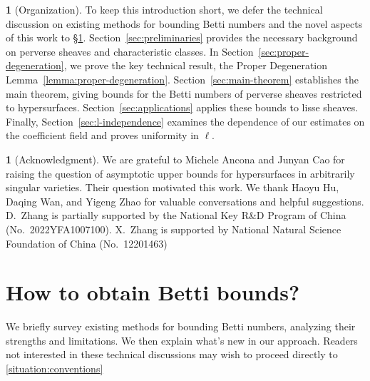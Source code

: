\documentclass[english]{smfart}
\theoremstyle{remark}
\theoremstyle{plain}
\theoremstyle{definition}
\numberwithin{equation}{remark}
\theoremstyle{void}
\newtheorem{situation}[remark]{}
\begin{document}
\begin{situation}[Organization]
To keep this introduction short, we defer the technical discussion on
existing methods for bounding Betti numbers and the novel aspects of
this work to \S\ref{sec:howto}.  Section~\ref{sec:preliminaries}
provides the necessary background on perverse sheaves and
characteristic classes.  In Section~\ref{sec:proper-degeneration}, we
prove the key technical result, the Proper Degeneration
Lemma~\ref{lemma:proper-degeneration}.  Section~\ref{sec:main-theorem}
establishes the main theorem, giving bounds for the Betti numbers of
perverse sheaves restricted to hypersurfaces.
Section~\ref{sec:applications} applies these bounds to lisse sheaves.
Finally, Section~\ref{sec:l-independence} examines the dependence of
our estimates on the coefficient field and proves uniformity in
\(\ell\).
\end{situation}

\begin{situation}[Acknowledgment]
We are grateful to Michele Ancona and Junyan Cao for raising the
question of asymptotic upper bounds for hypersurfaces in arbitrarily
singular varieties.  Their question motivated this work.  We thank
Haoyu Hu, Daqing Wan, and Yigeng Zhao for valuable conversations and
helpful suggestions.  D.~Zhang is partially supported by the National
Key R\&D Program of China (No.~2022YFA1007100).  X.~Zhang is supported
by National Natural Science Foundation of China (No.~12201463)


\end{situation}


\section{How to obtain Betti bounds?}
\label{sec:howto}

We briefly survey existing methods for bounding Betti numbers,
analyzing their strengths and limitations.  We then explain what's new
in our approach.  Readers not interested in these technical
discussions may wish to proceed directly to
\ref{situation:conventions}
\end{document}
